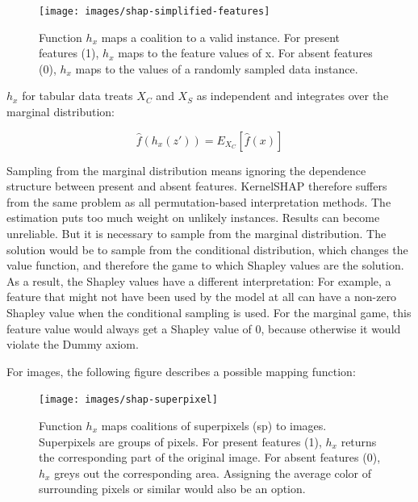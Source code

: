 \documentclass[
  10pt,
]{scrbook}
\begin{document}
\begin{figure}

{\centering \texttt{[image: images/shap-simplified-features]} 

}

\caption{Function $h_x$ maps a coalition to a valid instance. For present features (1), $h_x$ maps to the feature values of x. For absent features (0), $h_x$ maps to the values of a randomly sampled data instance.}\label{fig:shap-simplified-feature}
\end{figure}

\(h_x\) for tabular data treats \(X_C\) and \(X_S\) as independent and integrates over the marginal distribution:

\[\hat{f}(h_x(z'))=E_{X_C}[\hat{f}(x)]\]

Sampling from the marginal distribution means ignoring the dependence structure between present and absent features.
KernelSHAP therefore suffers from the same problem as all permutation-based interpretation methods.
The estimation puts too much weight on unlikely instances.
Results can become unreliable.
But it is necessary to sample from the marginal distribution.
The solution would be to sample from the conditional distribution, which changes the value function, and therefore the game to which Shapley values are the solution.
As a result, the Shapley values have a different interpretation:
For example, a feature that might not have been used by the model at all can have a non-zero Shapley value when the conditional sampling is used.
For the marginal game, this feature value would always get a Shapley value of 0, because otherwise it would violate the Dummy axiom.

For images, the following figure describes a possible mapping function:

\begin{figure}

{\centering \texttt{[image: images/shap-superpixel]} 

}

\caption{Function $h_x$ maps coalitions of superpixels (sp) to images. Superpixels are groups of pixels. For present features (1), $h_x$ returns the corresponding part of the original image. For absent features (0), $h_x$ greys out the corresponding area. Assigning the average color of surrounding pixels or similar would also be an option.}\label{fig:unnamed-chunk-43}
\end{figure}
\end{document}
